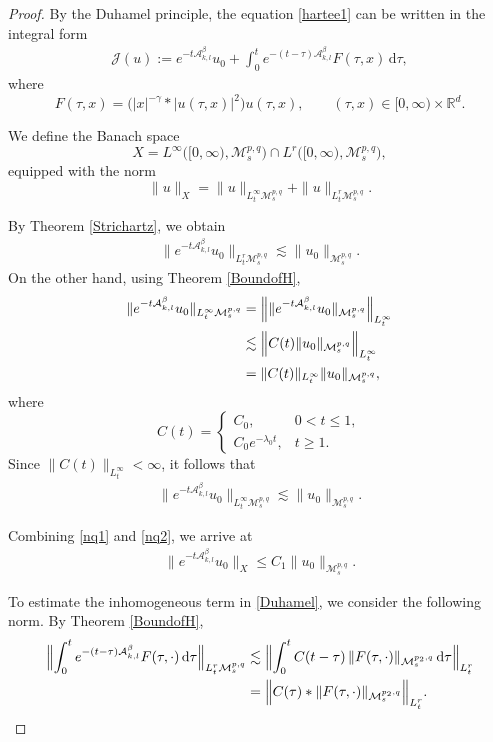 \documentclass[12pt,reqno,a4paper]{amsart}
\numberwithin{equation}{section}
\theoremstyle{plain}
\theoremstyle{definition}
\theoremstyle{remark}
\def\M{\mathcal{M}}
\def \Ad{\mathcal{A}_{k,l}}
\def \M{{\mathcal M}}
\begin{document}
\begin{proof}
By the Duhamel principle, the equation \eqref{hartee1} can be written in the integral form
\begin{align}
\label{Duhamel}
\mathcal{J}(u)
:=e^{-t\Ad^{\beta}}u_{0}
+\int_{0}^{t}e^{-(t-\tau)\Ad^{\beta}}F(\tau,x)\,\mathrm{d}\tau,
\end{align}
where
\[
F(\tau,x)
=\bigl(|x|^{-\gamma}*|u(\tau,x)|^{2}\bigr)u(\tau,x),
\qquad
(\tau,x)\in [0,\infty)\times\mathbb{R}^{d}.
\]

We define the Banach space
\[
X
=
L^{\infty}\bigl([0,\infty),\M^{p,q}_{s}\bigr)
\cap
L^{r}\bigl([0,\infty),\M^{p,q}_{s}\bigr),
\]
equipped with the norm
\[
\|u\|_{X}
=
\|u\|_{L^{\infty}_{t}\M^{p,q}_{s}}
+
\|u\|_{L^{r}_{t}\M^{p,q}_{s}}.
\]

By Theorem \ref{Strichartz}, we obtain
\begin{align}
\label{nq1}
\|e^{-t\Ad^{\beta}}u_{0}\|_{L^{r}_{t}\M^{p,q}_{s}}
\lesssim
\|u_{0}\|_{\M^{p,q}_{s}}.
\end{align}
On the other hand, using Theorem \ref{BoundofH},
\begin{align*}
\|e^{-t\Ad^{\beta}}u_{0}\|_{L^{\infty}_{t}\M^{p,q}_{s}}
&=
\Bigl\|
\|e^{-t\Ad^{\beta}}u_{0}\|_{\M^{p,q}_{s}}
\Bigr\|_{L^{\infty}_{t}} \\
&\lesssim
\Bigl\|
C(t)\|u_{0}\|_{\M^{p,q}_{s}}
\Bigr\|_{L^{\infty}_{t}} \\
&=
\|C(t)\|_{L^{\infty}_{t}}
\|u_{0}\|_{\M^{p,q}_{s}},
\end{align*}
where
\[
C(t)=
\begin{cases}
C_{0}, & 0<t\leq 1,\\[0.3em]
C_{0}e^{-\lambda_{0}t}, & t\geq 1.
\end{cases}
\]
Since $\|C(t)\|_{L^{\infty}_{t}}<\infty$, it follows that
\begin{align}
\label{nq2}
\|e^{-t\Ad^{\beta}}u_{0}\|_{L^{\infty}_{t}\M^{p,q}_{s}}
\lesssim
\|u_{0}\|_{\M^{p,q}_{s}}.
\end{align}

Combining \eqref{nq1} and \eqref{nq2}, we arrive at
\begin{align}
\label{homo}
\|e^{-t\Ad^{\beta}}u_{0}\|_{X}
\leq
C_{1}\|u_{0}\|_{\M^{p,q}_{s}}.
\end{align}


To estimate the inhomogeneous term in \eqref{Duhamel}, we consider the following norm. By Theorem \ref{BoundofH},
\begin{align}
\label{inhm1}
\Bigl\|
\int_{0}^{t}e^{-(t-\tau)\Ad^{\beta}}F(\tau,\cdot)\,\mathrm{d}\tau
\Bigr\|_{L^{r}_{t}\M^{p,q}_{s}}
&\lesssim
\Bigl\|
\int_{0}^{t}
C(t-\tau)\,
\|F(\tau,\cdot)\|_{\M^{p_{2},q}_{s}}
\,\mathrm{d}\tau
\Bigr\|_{L^{r}_{t}}
\nonumber\\
&=
\Bigl\|
C(\tau)
*
\|F(\tau,\cdot)\|_{\M^{p_{2},q}_{s}}
\Bigr\|_{L^{r}_{t}}.
\end{align}


\end{proof}
\end{document}
